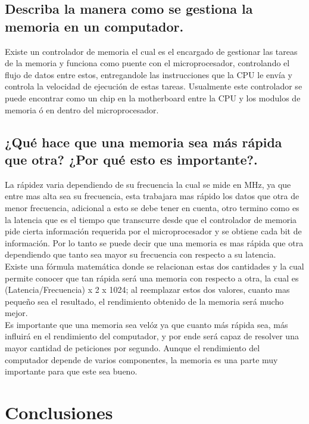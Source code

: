 \documentclass{article}
\begin{document}
\subsection{\textbf{Describa la manera como se gestiona la memoria en un computador.}}
Existe un controlador de memoria el cual es el encargado de gestionar las tareas de la memoria y funciona como puente con el microprocesador, controlando el flujo de datos entre estos, entregandole las instrucciones que la CPU le envía y controla la velocidad de ejecución de estas tareas. Usualmente este controlador se puede encontrar como un chip en la motherboard entre la CPU y los modulos de memoria ó en dentro del microprocesador. \cite{augusto}
\subsection{\textbf{¿Qué hace que una memoria sea más rápida que otra? ¿Por qué esto es importante?.}}
La rápidez varia dependiendo de su frecuencia la cual se mide en MHz, ya que entre mas alta sea su frecuencia, esta trabajara mas rápido los datos que otra de menor frecuencia, adicional a esto se debe tener en cuenta, otro termino como es la latencia que es el tiempo que transcurre desde que el controlador de memoria pide cierta información requerida por el microprocesador y se obtiene cada bit de información. Por lo tanto se puede decir que una memoria es mas rápida que otra dependiendo que tanto sea mayor su frecuencia con respecto a su latencia.\cite{hardzone}\\
Existe una fórmula matemática donde se relacionan estas dos cantidades y la cual permite conocer que tan rápida será una memoria con respecto a otra, la cual es (Latencia/Frecuencia) x 2 x 1024; \cite{computer} al reemplazar estos dos valores, cuanto mas pequeño sea el resultado, el rendimiento obtenido de la memoria será mucho mejor.\\
Es importante que una memoria sea velóz ya que cuanto más rápida sea, más influirá en el rendimiento del computador, y por ende será capaz de resolver una mayor cantidad de peticiones por segundo. Aunque el rendimiento del computador depende de varios componentes, la memoria es una parte muy importante para que este sea bueno. \cite{computer}
    

\section{Conclusiones} \label{conclusion}
\end{document}

